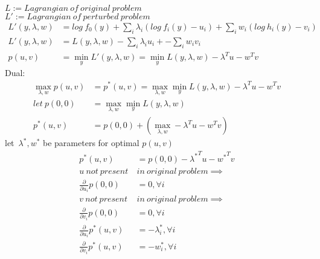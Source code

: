 \documentclass[12pt,letter]{article}
\begin{document}
\begin{enumerate}
  $L:=Lagrangian\ of\ original\ problem$\\
  $L':=Lagrangian\ of\ perturbed\ problem$\\
  \begin{align*}
    L'(y,\lambda,w) &= log\ f_0(y) + \sum_i \lambda_i(log\ f_i(y)-u_i) + \sum_i w_i(log\ h_i(y) -v_i)\\
    L'(y,\lambda,w) &= L(y,\lambda,w) -\sum_i \lambda_i u_i + -\sum_i w_i v_i\\
    p(u,v) &= \min_y L'(y,\lambda,w) = \min_y L(y,\lambda,w) - \lambda^Tu- w^Tv
  \end{align*}
  Dual:
  \begin{align*}
  \max_{\lambda,w} p(u,v) &= p^*(u,v) = \max_{\lambda,w} \min_y L(y,\lambda,w) - \lambda^Tu- w^Tv\\
    let\ p(0,0) &= \max_{\lambda,w} \min_y L(y,\lambda,w)\\
    p^*(u,v) &= p(0,0) + (\max_{\lambda,w} -\lambda^Tu- w^Tv)
  \end{align*}
  let\ $\lambda^*, w^*$ be parameters for optimal $p(u,v)$
  \begin{align*}
    p^*(u,v) &= p(0,0) -{\lambda^*}^Tu- {w^*}^Tv\\
             u\ not\ present\ &in\ original\ problem \implies\\
    \frac{\partial}{\partial u_i}p(0,0) &= 0, \forall i\\
             v\ not\ present\ &in\ original\ problem \implies\\
    \frac{\partial}{\partial v_i}p(0,0) &= 0, \forall i\\
    \frac{\partial}{\partial u_i} p^*(u,v) &= -\lambda_i^*, \forall i\\
    \frac{\partial}{\partial v_i} p^*(u,v) &= -w_i^*, \forall i\\
  \end{align*}
  

\end{enumerate}
\end{document}

